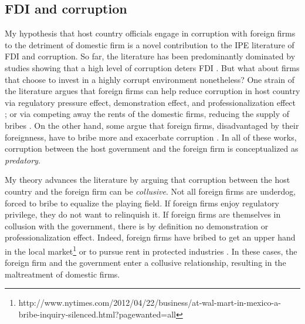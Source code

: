 \subsection{FDI and corruption}

My hypothesis that host country officials engage in corruption with foreign firms to the detriment of domestic firm is a novel contribution to the IPE literature of FDI and corruption. So far, the literature has been predominantly dominated by studies showing that a high level of corruption deters FDI \citep{Wei2000, Hakkala2008, Al-Sadig2009}. But what about firms that choose to invest in a highly corrupt environment nonetheless? One strain of the literature argues that foreign firms can help reduce corruption in host country via regulatory pressure effect, demonstration effect, and professionalization effect \citep{Kwok2006}; or via competing away the rents of the domestic firms, reducing the supply of bribes \citep{Sandholtz2003}. On the other hand, some argue that foreign firms, disadvantaged by their foreignness, have to bribe more and exacerbate corruption \citep{Hellman2002}. In all of these works, corruption between the host government and the foreign firm is conceptualized as \textit{predatory}.

My theory advances the literature by arguing that corruption between the host country and the foreign firm can be \textit{collusive}. Not all foreign firms are underdog, forced to bribe to equalize the playing field. If foreign firms enjoy regulatory privilege, they do not want to relinquish it. If foreign firms are themselves in collusion with the government, there is by definition no demonstration or professionalization effect. Indeed, foreign firms have bribed to get an upper hand in the local market\footnote{http://www.nytimes.com/2012/04/22/business/at-wal-mart-in-mexico-a-bribe-inquiry-silenced.html?pagewanted=all} or to pursue rent in protected industries \citep{Malesky2015}. In these cases, the foreign firm and the government enter a collusive relationship, resulting in the maltreatment of domestic firms.


